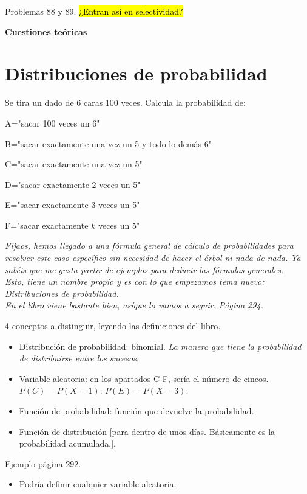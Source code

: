 Problemas 88 y 89. \hl{¿Entran así en selectividad?}


\textbf{Cuestiones teóricas}


\section{Distribuciones de probabilidad}

\begin{problem}
Se tira un dado de 6 caras 100 veces. Calcula la probabilidad de:

\ppart A="sacar 100 veces un 6"

\ppart B="sacar exactamente una vez un 5 y todo lo demás 6"

\ppart C="sacar exactamente una vez un 5"

\ppart D="sacar exactamente 2 veces un 5"

\ppart E="sacar exactamente 3 veces un 5"

\ppart F="sacar exactamente $k$ veces un 5"

\solution

\end{problem}

\textit{Fijaos, hemos llegado a una fórmula general de cálculo de probabilidades para resolver este caso específico sin necesidad de hacer el árbol ni nada de nada. Ya sabéis que me gusta partir de ejemplos para deducir las fórmulas generales.
\\
Esto, tiene un nombre propio y es con lo que empezamos tema nuevo: Distribuciones de probabilidad.
\\
En el libro viene bastante bien, asíque lo vamos a seguir. Página 294.
}

4 conceptos a distinguir, leyendo las definiciones del libro.
\begin{itemize}
	\item Distribución de probabilidad: binomial.
	\subitem \textit{La manera que tiene la probabilidad de distribuirse entre los sucesos}.
	\item Variable aleatoria: en los apartados C-F, sería el número de cincos.
	\subitem $P(C) = P(X=1)$.
	\subitem $P(E) = P(X=3)$.
	\item Función de probabilidad: función que devuelve la probabilidad.
	\item Función de distribución [para dentro de unos días. Básicamente es la probabilidad acumulada.].
\end{itemize}

Ejemplo página 292.
\begin{itemize}
	\item Podría definir cualquier variable aleatoria.
\end{itemize}


